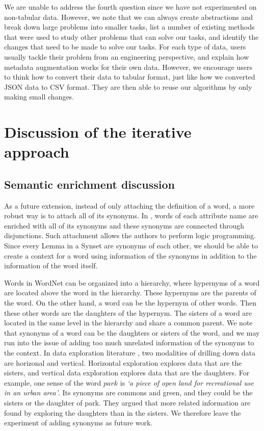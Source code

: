 We are unable to address the fourth question since we have not experimented on non-tabular data. However, we note that we can always create abstractions and break down large problems into smaller tasks, list a number of existing methods that were used to study other problems that can solve our tasks, and identify the changes that need to be made to solve our tasks. For each type of data, users usually tackle their problem from an engineering perspective, and explain how metadata augmentation works for their own data. However, we encourage users to think how to convert their data to tabular format, just like how we converted JSON data to CSV format. They are then able to reuse our algorithms by only making small changes.

\section{Discussion of the iterative approach}
\label{sec:DiscussionOfTheIterativeApproach}

\subsection{Semantic enrichment discussion}

As a future extension, instead of only attaching the definition of a word, a more robust way is to attach all of its synonyms. In \cite{Giunchiglia2005Semantic}, words of each attribute name are enriched with all of its synonyms and these synonyms are connected through disjunctions. Such attachment allows the authors to perform logic programming. Since every Lemma in a Synset are synonyms of each other, we should be able to create a context for a word using information of the synonyms in addition to the information of the word itself.

Words in WordNet can be organized into a hierarchy, where hypernyms of a word are located above the word in the hierarchy. These hypernyms are the parents of the word. On the other hand, a word can be the hypernym of other words. Then these other words are the daughters of the hypernym. The sisters of a word are located in the same level in the hierarchy and share a common parent. We note that synonyms of a word can be the daughters or sisters of the word, and we may run into the issue of adding too much unrelated information of the synonyms to the context. In data exploration literature \cite{10.14778/3021924.3021935}, two modalities of drilling down data are horizonal and vertical. Horizontal exploration explores data that are the sisters, and vertical data exploration explores data that are the daughters. For example, one sense of the word $park$ is \textit{`a piece of open land for recreational use in an urban area'}. Its synonyms are commons and green, and they could be the sisters or the daughter of park. They argued that more related information are found by exploring the daughters than in the sisters. We therefore leave the experiment of adding synonyms as future work.

